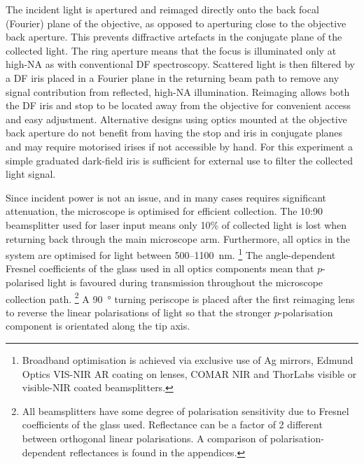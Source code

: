 \documentclass{article}
\begin{document}
The incident light is apertured and reimaged directly onto the back focal (Fourier) plane of the objective, as opposed to aperturing close to the objective back aperture. This prevents diffractive artefacts in the conjugate plane of the collected light. The ring aperture means that the focus is illuminated only at high-NA as with conventional DF spectroscopy. Scattered light is then filtered by a DF iris placed in a Fourier plane in the returning beam path to remove any signal contribution from reflected, high-NA illumination. Reimaging allows both the DF iris and stop to be located away from the objective for convenient access and easy adjustment. Alternative designs using optics mounted at the objective back aperture do not benefit from having the stop and iris in conjugate planes and may require motorised irises if not accessible by hand. For this experiment a simple graduated dark-field iris is sufficient for external use to filter the collected light signal.

Since incident power is not an issue, and in many cases requires significant attenuation, the microscope is optimised for efficient collection. The 10:90 beamsplitter used for laser input means only 10\% of collected light is lost when returning back through the main microscope arm. Furthermore, all optics in the system are optimised for light between 500--\SI{1100}{nm}.%
\footnote{Broadband optimisation is achieved via exclusive use of Ag mirrors, Edmund Optics VIS-NIR AR coating on lenses, COMAR NIR and ThorLabs visible or visible-NIR coated beamsplitters.}
The angle-dependent Fresnel coefficients of the glass used in all optics components mean that $p$-polarised light is favoured during transmission throughout the microscope collection path.%
\footnote{All beamsplitters have some degree of polarisation sensitivity due to Fresnel coefficients of the glass used. Reflectance can be a factor of 2 different between orthogonal linear polarisations. A comparison of polarisation-dependent reflectances is found in the appendices.}
A \SI{90}{\degree} turning periscope is placed after the first reimaging lens to reverse the linear polarisations of light so that the stronger $p$-polarisation component is orientated along the tip axis.
\end{document}
